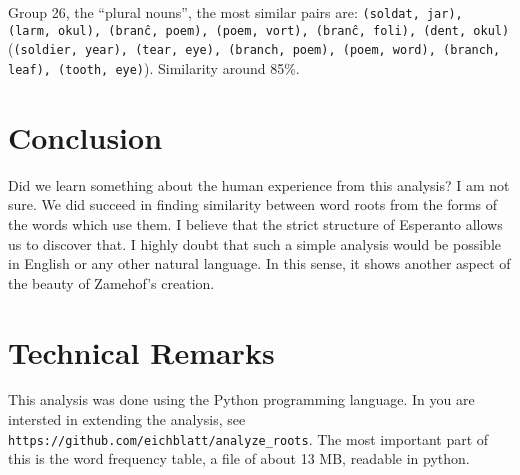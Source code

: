 \documentclass[12pt,twoside]{article}
\begin{document}
Group 26, the ``plural nouns'', the most similar pairs are: \texttt{(soldat, jar), (larm, okul), (branĉ, poem), (poem, vort), (branĉ, foli), (dent, okul)}
(\texttt{(soldier, year), (tear, eye), (branch, poem), (poem, word), (branch, leaf), (tooth, eye)}). Similarity around 85\%.

\section{Conclusion}

Did we learn something about the human experience from this analysis? I am not sure. 
We did succeed in finding similarity between word roots from the forms of the words which use them. I believe that the strict structure
of Esperanto allows us to discover that. I highly doubt that such a simple analysis would be possible in English or any other natural language. 
In this sense, it shows another aspect of the beauty of Zamehof's creation.

\section{Technical Remarks}

This analysis was done using the Python programming language. In you are intersted in extending the analysis, 
see \texttt{https://github.com/eichblatt/analyze\_roots}.
The most important part of this is the word frequency table, a file of about 13 MB, readable in python.
\end{document}
